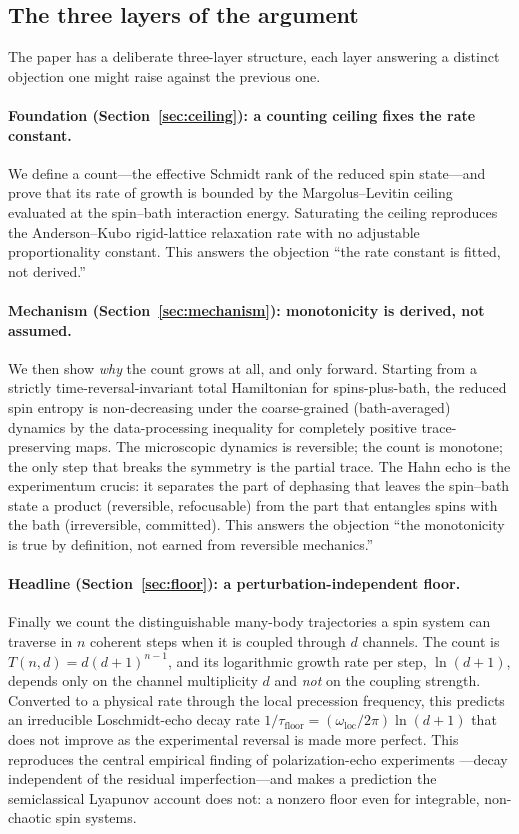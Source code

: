 \documentclass[twocolumn,10pt,a4paper]{article}
\theoremstyle{thmstyle}
\theoremstyle{definition}
\theoremstyle{remark}
\begin{document}
\subsection{The three layers of the argument}

The paper has a deliberate three-layer structure, each layer answering a
distinct objection one might raise against the previous one.

\paragraph{Foundation (Section~\ref{sec:ceiling}): a counting ceiling
fixes the rate constant.} We define a count---the effective Schmidt rank
of the reduced spin state---and prove that its rate of growth is bounded
by the Margolus--Levitin ceiling evaluated at the spin--bath interaction
energy. Saturating the ceiling reproduces the Anderson--Kubo rigid-lattice
relaxation rate with no adjustable proportionality constant. This answers
the objection ``the rate constant is fitted, not derived.''

\paragraph{Mechanism (Section~\ref{sec:mechanism}): monotonicity is
derived, not assumed.} We then show \emph{why} the count grows at all,
and only forward. Starting from a strictly time-reversal-invariant total
Hamiltonian for spins-plus-bath, the reduced spin entropy is
non-decreasing under the coarse-grained (bath-averaged) dynamics by the
data-processing inequality for completely positive trace-preserving maps.
The microscopic dynamics is reversible; the count is monotone; the only
step that breaks the symmetry is the partial trace. The Hahn echo is the
experimentum crucis: it separates the part of dephasing that leaves the
spin--bath state a product (reversible, refocusable) from the part that
entangles spins with the bath (irreversible, committed). This answers the
objection ``the monotonicity is true by definition, not earned from
reversible mechanics.''

\paragraph{Headline (Section~\ref{sec:floor}): a
perturbation-independent floor.} Finally we count the distinguishable
many-body trajectories a spin system can traverse in $n$ coherent steps
when it is coupled through $d$ channels. The count is $T(n,d)=d(d+1)^{n-1}$,
and its logarithmic growth rate per step, $\ln(d+1)$, depends only on the
channel multiplicity $d$ and \emph{not} on the coupling strength.
Converted to a physical rate through the local precession frequency, this
predicts an irreducible Loschmidt-echo decay rate
$1/\tau_{\mathrm{floor}}=(\omega_{\mathrm{loc}}/2\pi)\ln(d+1)$ that does
not improve as the experimental reversal is made more perfect. This
reproduces the central empirical finding of polarization-echo experiments
\citep{levstein1998,pastawski2000,jalabert2001}---decay independent of the
residual imperfection---and makes a prediction the semiclassical Lyapunov
account does not: a nonzero floor even for integrable, non-chaotic spin
systems.
\end{document}
